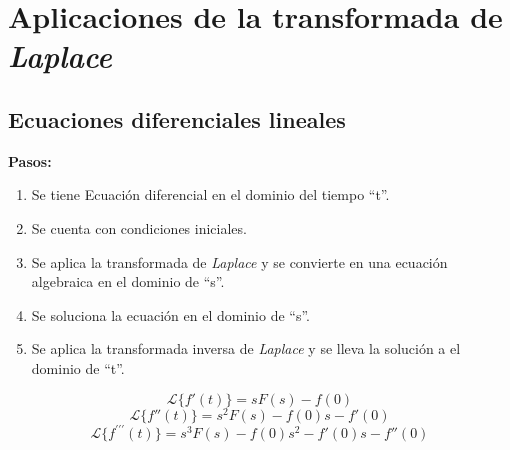 \chapter{Aplicaciones de la transformada de \emph{Laplace}}

\section{Ecuaciones diferenciales lineales}

\textbf{Pasos:}
\begin{enumerate}
    \item Se tiene Ecuación diferencial en el dominio del tiempo ``t''.
    \item Se cuenta con condiciones iniciales.
    \item Se aplica la transformada de \emph{Laplace} y se convierte en una
    ecuación algebraica en el dominio de ``s''.
    \item Se soluciona la ecuación en el dominio de ``s''.
    \item Se aplica la transformada inversa de \emph{Laplace} y se lleva la
    solución a el dominio de ``t''.
\end{enumerate}

\begin{equation}
    \mathcal{L}\{f'(t)\}=sF(s)-f(0)
\end{equation}
\begin{equation}
    \mathcal{L}\{f''(t)\}=s^2F(s)-f(0)s-f'(0)
\end{equation}
\begin{equation}
    \mathcal{L}\{f^{\prime\prime\prime}(t)\}=s^3F(s)-f(0)s^2-f'(0)s-f''(0)
\end{equation}


